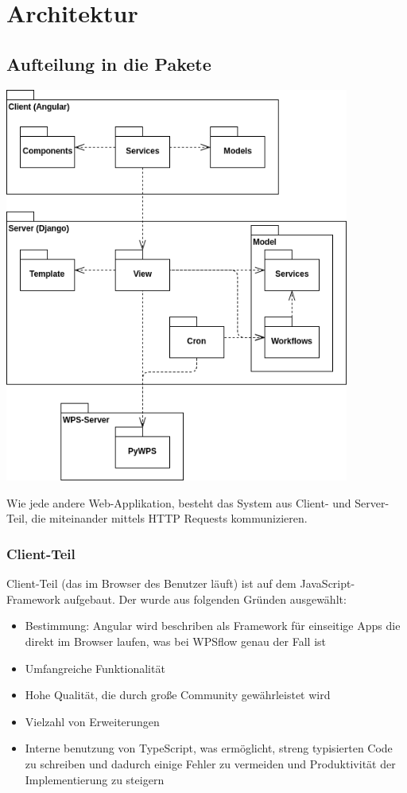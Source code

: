 \chapter{Architektur}

    \section{Aufteilung in die Pakete}

    \includegraphics[width=0.85\textwidth]{images/package_diagram.png}

    Wie jede andere Web-Applikation, besteht das System aus Client- und Server-Teil, die miteinander mittels HTTP Requests kommunizieren.
    
        \subsection{Client-Teil}
        
        Client-Teil (das im Browser des Benutzer läuft) ist auf dem JavaScript-Framework aufgebaut. Der wurde aus folgenden Gründen ausgewählt:
        
        \begin{itemize}
            \item Bestimmung: Angular wird beschriben als Framework für einseitige Apps die direkt im Browser laufen, was bei WPSflow genau der Fall ist
            \item Umfangreiche Funktionalität
            \item Hohe Qualität, die durch große Community gewährleistet wird
            \item Vielzahl von Erweiterungen
            \item Interne benutzung von TypeScript, was ermöglicht, streng typisierten Code zu schreiben und dadurch einige Fehler zu vermeiden und Produktivität der Implementierung zu steigern
        \end{itemize}

